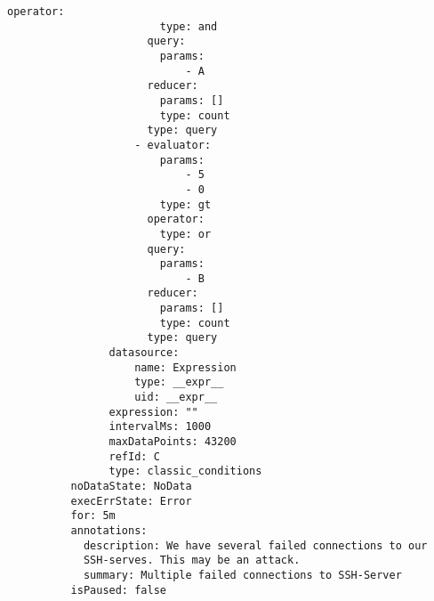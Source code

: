 {\begin{Verbatim}[frame=single]
                      operator:
                        type: and
                      query:
                        params:
                            - A
                      reducer:
                        params: []
                        type: count
                      type: query
                    - evaluator:
                        params:
                            - 5
                            - 0
                        type: gt
                      operator:
                        type: or
                      query:
                        params:
                            - B
                      reducer:
                        params: []
                        type: count
                      type: query
                datasource:
                    name: Expression
                    type: __expr__
                    uid: __expr__
                expression: ""
                intervalMs: 1000
                maxDataPoints: 43200
                refId: C
                type: classic_conditions
          noDataState: NoData
          execErrState: Error
          for: 5m
          annotations:
            description: We have several failed connections to our 
            SSH-serves. This may be an attack.
            summary: Multiple failed connections to SSH-Server
          isPaused: false
  
\end{Verbatim}
}